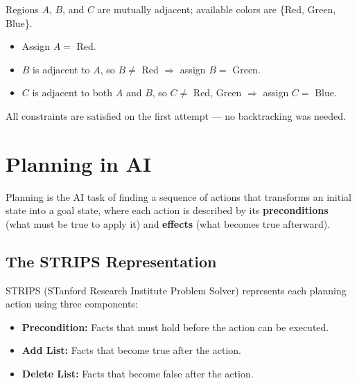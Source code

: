 \documentclass[11pt,a4paper]{article}
\begin{document}
\begin{center}
\end{center}

\begin{examplebox}
Regions $A$, $B$, and $C$ are mutually adjacent; available colors are \{Red, Green, Blue\}.
\begin{itemize}[leftmargin=*]
  \item Assign $A=$ Red.
  \item $B$ is adjacent to $A$, so $B \neq$ Red $\Rightarrow$ assign $B=$ Green.
  \item $C$ is adjacent to both $A$ and $B$, so $C \neq$ Red, Green $\Rightarrow$ assign $C=$ Blue.
\end{itemize}
All constraints are satisfied on the first attempt --- no backtracking was needed.
\end{examplebox}

\section{Planning in AI}

\begin{definitionbox}[Planning]
Planning is the AI task of finding a sequence of actions that transforms an initial state into a goal state, where each action is described by its \textbf{preconditions} (what must be true to apply it) and \textbf{effects} (what becomes true afterward).
\end{definitionbox}

\subsection{The STRIPS Representation}
\begin{conceptbox}[STRIPS]
STRIPS (STanford Research Institute Problem Solver) represents each planning action using three components:
\begin{itemize}[leftmargin=*]
  \item \textbf{Precondition:} Facts that must hold before the action can be executed.
  \item \textbf{Add List:} Facts that become true after the action.
  \item \textbf{Delete List:} Facts that become false after the action.
\end{itemize}
\end{conceptbox}
\end{document}
